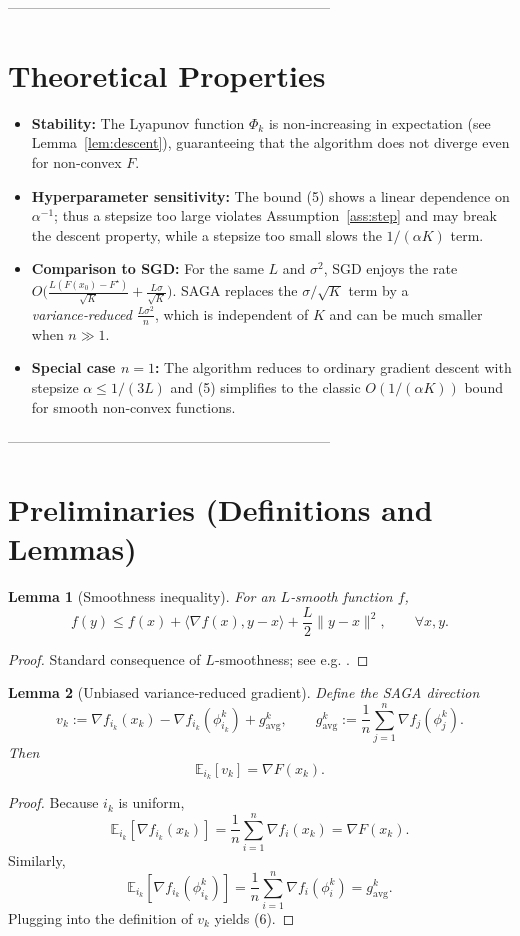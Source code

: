 \documentclass{article}
\newtheorem{lemma}{Lemma}
\newcommand{\E}{\mathbb{E}}
\begin{document}
---------------------------------------------------------------------

\section*{Theoretical Properties}

\begin{itemize}
\item \textbf{Stability:} The Lyapunov function $\Phi_k$ is non‑increasing in expectation (see Lemma~\ref{lem:descent}), guaranteeing that the algorithm does not diverge even for non‑convex $F$.
\item \textbf{Hyperparameter sensitivity:} The bound (5) shows a linear dependence on $\alpha^{-1}$; thus a stepsize too large violates Assumption~\ref{ass:step} and may break the descent property, while a stepsize too small slows the $1/(\alpha K)$ term.
\item \textbf{Comparison to SGD:} For the same $L$ and $\sigma^{2}$, SGD enjoys the rate $O\!\big(\frac{L(F(x_0)-F^{\star})}{\sqrt{K}}+\frac{L\sigma}{\sqrt{K}}\big)$. SAGA replaces the $\sigma/\sqrt{K}$ term by a \emph{variance‑reduced} $\frac{L\sigma^{2}}{n}$, which is independent of $K$ and can be much smaller when $n\gg1$.
\item \textbf{Special case $n=1$:} The algorithm reduces to ordinary gradient descent with stepsize $\alpha\le 1/(3L)$ and (5) simplifies to the classic $O(1/(\alpha K))$ bound for smooth non‑convex functions.
\end{itemize}

---------------------------------------------------------------------

\section*{Preliminaries (Definitions and Lemmas)}

\begin{lemma}[Smoothness inequality]\label{lem:smooth}
For an $L$‑smooth function $f$,
\[
f(y)\le f(x)+\langle\nabla f(x),y-x\rangle+\frac{L}{2}\|y-x\|^{2},\qquad\forall x,y.
\]
\end{lemma}
\begin{proof}
Standard consequence of $L$‑smoothness; see e.g. \cite{Nesterov2004}.
\end{proof}

\begin{lemma}[Unbiased variance‑reduced gradient]\label{lem:unbiased}
Define the SAGA direction 
\[
v_k:=\nabla f_{i_k}(x_k)-\nabla f_{i_k}(\phi_{i_k}^{k})+g_{\text{avg}}^{k},\qquad 
g_{\text{avg}}^{k}:=\frac1n\sum_{j=1}^{n}\nabla f_j(\phi_j^{k}).
\]
Then 
\[
\E_{i_k}[v_k]=\nabla F(x_k).
\tag{6}
\]
\end{lemma}
\begin{proof}
Because $i_k$ is uniform,
\[
\E_{i_k}[\nabla f_{i_k}(x_k)]=\frac1n\sum_{i=1}^{n}\nabla f_i(x_k)=\nabla F(x_k).
\]
Similarly,
\[
\E_{i_k}[\nabla f_{i_k}(\phi_{i_k}^{k})]=\frac1n\sum_{i=1}^{n}\nabla f_i(\phi_i^{k})=g_{\text{avg}}^{k}.
\]
Plugging into the definition of $v_k$ yields (6).
\end{proof}
\end{document}

